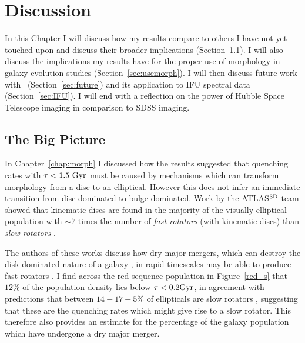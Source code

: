 \chapter{Discussion}

In this Chapter I will discuss how my results compare to others I have not yet touched upon and discuss their broader implications (Section~\ref{sec:bigpic}). I will also discuss the implications my results have for the proper use of morphology in galaxy evolution studies (Section~\ref{sec:usemorph}). I will then discuss future work with \starpy\ (Section~\ref{sec:future}) and its application to IFU spectral data (Section~\ref{sec:IFU}). I will end with a reflection on the power of Hubble Space Telescope imaging in comparison to SDSS imaging. 

\section{The Big Picture}\label{sec:bigpic}

In Chapter~\ref{chap:morph} I discussed how the results suggested that quenching rates with $\tau < 1.5~\rm{Gyr}$ must be caused by mechanisms which can transform morphology from a disc to an elliptical. However this does not infer an immediate transition from disc dominated to bulge dominated. Work by the \textsc{ATLAS}$^{\rm{3D}}$ team \citep{cappellari11} showed that kinematic discs are found in the majority of the visually elliptical population \citep{emsellem11} with $\sim7$ times the number of \emph{fast rotators} (with kinematic discs) than \emph{slow rotators} \citep[with dispersion dominated kinematics see][]{cappellari07, emsellem07}. 

The authors of these works discuss how dry major mergers, which can destroy the disk dominated nature of a galaxy \citep{toomre72}, in rapid timescales may be able to produce fast rotators \citep{duc11, naab14}. I find across the red sequence population in Figure~\ref{red_s} that $12\%$ of the population density lies below $\tau <0.2 \rm{Gyr}$, in agreement with predictions that between $14-17\pm5\%$ of ellipticals are slow rotators \citep{emsellem11, stott16}, suggesting that these are the quenching rates which might give rise to a slow rotator. This therefore also provides an estimate for the percentage of the galaxy population which have undergone a dry major merger.  

